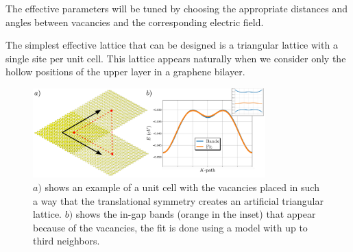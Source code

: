 The effective parameters will be tuned by choosing the appropriate distances and angles between vacancies and the corresponding electric field.


The simplest effective lattice that can be designed is a triangular lattice with a single site per unit cell. This lattice appears naturally when we consider only the hollow positions of the upper layer in a graphene bilayer.

\begin{figure}[h!]
  \centering
  \includegraphics[width=0.8\textwidth]{artlat/fig/triangular_bands.pdf}
  \vspace{-5pt}
  \caption{$a)$ shows an example of a unit cell with the vacancies placed in such a way that the translational symmetry creates an artificial triangular lattice. $b)$ shows the in-gap bands (orange in the inset) that appear because of the vacancies, the fit is done using a model with up to third neighbors.}
  \label{triangular}
\end{figure}
\FloatBarrier

